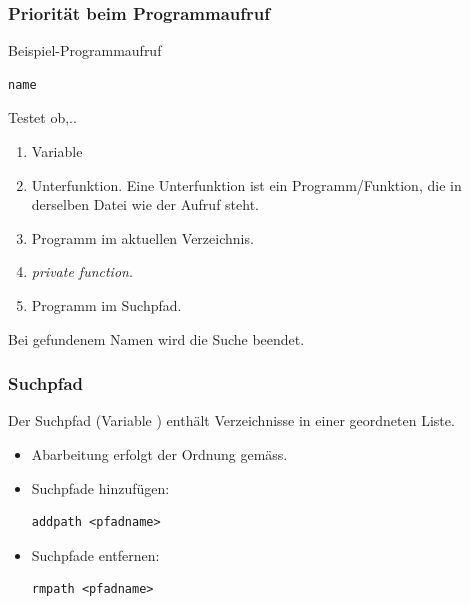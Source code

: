 \documentclass[hyperref={xetex}]{beamer}
\begin{document}
\begin{frame}[fragile]\frametitle{Priorität beim Programmaufruf}
Beispiel-Programmaufruf
\begin{lstlisting}
name
\end{lstlisting}

Testet ob,..
\begin{enumerate}
\item  \alert{Variable}
\item  \alert{Unterfunktion}. Eine
  Unterfunktion ist ein Programm/Funktion, die in derselben Datei wie der
  Aufruf steht.
\item  Programm im \alert{aktuellen Verzeichnis}.
\item  \textit{private function}.
\item  Programm im \alert{Suchpfad}. 
\end{enumerate}
Bei gefundenem Namen wird die Suche beendet.
\end{frame}

\begin{frame}[fragile]\frametitle{Suchpfad}

Der Suchpfad (Variable ) enthält Verzeichnisse in einer geordneten Liste.

\begin{itemize}
\item Abarbeitung erfolgt der Ordnung gemäss.
\item  Suchpfade hinzufügen:
\begin{lstlisting}
addpath <pfadname>
\end{lstlisting}
\item Suchpfade entfernen:
\begin{lstlisting}
rmpath <pfadname>
\end{lstlisting}
\end{itemize}
\end{frame}
\end{document}
